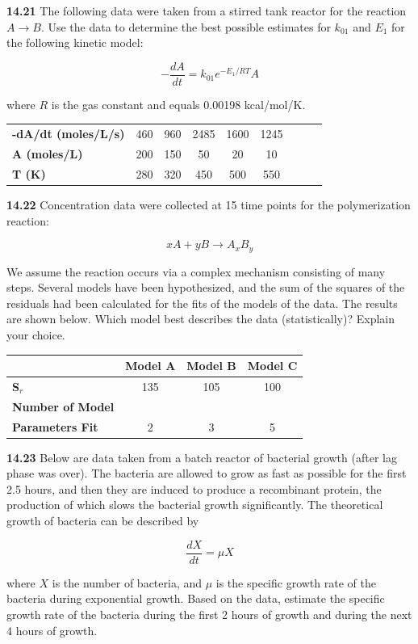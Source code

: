 \documentclass[../main.tex]{subfiles}
\begin{document}
\begin{multicols}{2}
	\noindent\textbf{14.21}  The following data were taken from a stirred tank reactor for the reaction $A \rightarrow B$. Use the data to determine the
	best possible estimates for $k_{01}$ and $E_1$ for the following
	kinetic model:

	$$- \frac{d A}{d t} = k _{01} e^{-E_1 / RT} A$$

	\noindent where $R$ is the gas constant and equals 0.00198 kcal/mol/K.

	\noindent \begin{tabular}{l c c c c c c c c}
		\textbf{-dA/dt (moles/L/s)} & 460 & 960 & 2485 & 1600 & 1245 \\ 
		\textbf{A (moles/L)} & 200 & 150 & 50 & 20 & 10 \\
		\textbf{T (K)} & 280 & 320 & 450 & 500 & 550
	\end{tabular}

	\noindent\textbf{14.22} Concentration data were collected at 15 time points
	for the polymerization reaction:

	$$x A + y B \rightarrow A_x B_y$$

	\noindent We assume the reaction occurs via a complex mechanism
	consisting of many steps. Several models have been hypothesized, and the sum of the squares of the residuals had been
	calculated for the fits of the models of the data. The results are shown below. Which model best describes the data (statistically)? Explain your choice.


	\noindent \begin{tabular}{l c c c}
		 & \textbf{Model A} & \textbf{Model B} & \textbf{Model C} \\
		\hline
		\textbf{S$_r$} & 135 & 105 & 100 \\
		\textbf{Number of Model} \\
		\textbf{Parameters Fit} & 2 & 3 & 5
  	\end{tabular}

	\noindent\textbf{14.23} Below are data taken from a batch reactor of bacterial
	growth (after lag phase was over). The bacteria are allowed
	to grow as fast as possible for the first 2.5 hours, and then
	they are induced to produce a recombinant protein, the production of which slows the bacterial growth significantly.
	The theoretical growth of bacteria can be described by

	$$\frac{d X}{dt} = \mu X$$

	\noindent where $X$ is the number of bacteria, and $\mu$ is the specific
	growth rate of the bacteria during exponential growth. Based
	on the data, estimate the specific growth rate of the bacteria
	during the first 2 hours of growth and during the next 4 hours
	of growth.


\end{multicols}
\end{document}

